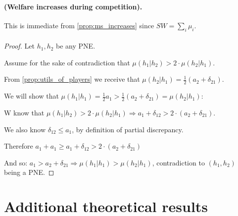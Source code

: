 \paragraph{ (Welfare increases during competition).}

This is immediate from \cref{prop:ms_increases} since $SW = \sum_i \mu_i$.

\paragraph{}
\begin{proof}
    Let $h_1,h_2$ be any PNE.
    
    Assume for the sake of contradiction that $\mu(h_1|h_2) > 2\cdot \mu(h_2|h_1)$. 

    From \cref{prop:utils_of_players} we receive that $\mu(h_2|h_1) = \frac{1}{2}(a_2 + \delta_{21})$.

    We will show that $\mu(h_1|h_1) = \frac{1}{2}a_1 > \frac{1}{2}(a_2 + \delta_{21})= \mu(h_2|h_1)$:

    W know that $\mu(h_1|h_2) > 2\cdot \mu(h_2|h_1) \Rightarrow a_1 + \delta_{12} > 2\cdot(a_2 + \delta_{21})$.

    We also know $\delta_{12} \le a_1$, by definition of  partial discrepancy.

    Therefore $a_1 + a_1 \ge a_1 + \delta_{12} > 2\cdot(a_2 + \delta_{21})$

    And so: $a_1 > a_2 + \delta_{21} \Rightarrow \mu(h_1|h_1) > \mu(h_2|h_1)$, contradiction to  $(h_1,h_2)$ being a PNE.

    
\end{proof}


\section{Additional theoretical results} \label{appx:add_theory}

